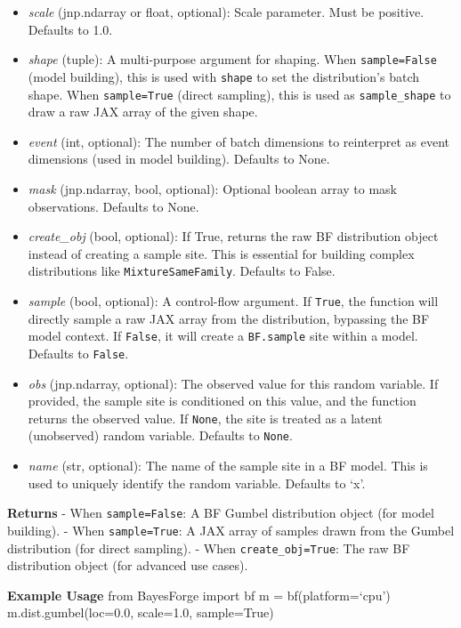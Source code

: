 \documentclass[
  letterpaper,
  DIV=11,
  numbers=noendperiod]{scrartcl}
\begin{document}
\begin{itemize}
\item
  \emph{scale} (jnp.ndarray or float, optional): Scale parameter. Must
  be positive. Defaults to 1.0.
\item
  \emph{shape} (tuple): A multi-purpose argument for shaping. When
  \texttt{sample=False} (model building), this is used with
  \texttt{shape} to set the distribution's batch shape. When
  \texttt{sample=True} (direct sampling), this is used as
  \texttt{sample\_shape} to draw a raw JAX array of the given shape.
\item
  \emph{event} (int, optional): The number of batch dimensions to
  reinterpret as event dimensions (used in model building). Defaults to
  None.
\item
  \emph{mask} (jnp.ndarray, bool, optional): Optional boolean array to
  mask observations. Defaults to None.
\item
  \emph{create\_obj} (bool, optional): If True, returns the raw BF
  distribution object instead of creating a sample site. This is
  essential for building complex distributions like
  \texttt{MixtureSameFamily}. Defaults to False.
\item
  \emph{sample} (bool, optional): A control-flow argument. If
  \texttt{True}, the function will directly sample a raw JAX array from
  the distribution, bypassing the BF model context. If \texttt{False},
  it will create a \texttt{BF.sample} site within a model. Defaults to
  \texttt{False}.
\item
  \emph{obs} (jnp.ndarray, optional): The observed value for this random
  variable. If provided, the sample site is conditioned on this value,
  and the function returns the observed value. If \texttt{None}, the
  site is treated as a latent (unobserved) random variable. Defaults to
  \texttt{None}.
\item
  \emph{name} (str, optional): The name of the sample site in a BF
  model. This is used to uniquely identify the random variable. Defaults
  to `x'.
\end{itemize}

\textbf{Returns} - When \texttt{sample=False}: A BF Gumbel distribution
object (for model building). - When \texttt{sample=True}: A JAX array of
samples drawn from the Gumbel distribution (for direct sampling). - When
\texttt{create\_obj=True}: The raw BF distribution object (for advanced
use cases).

\textbf{Example Usage} from BayesForge import bf m = bf(platform=`cpu')
m.dist.gumbel(loc=0.0, scale=1.0, sample=True)
\end{document}
